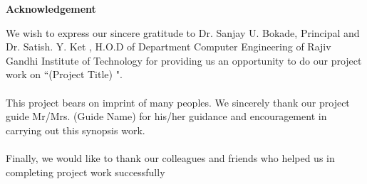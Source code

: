 \newpage
\thispagestyle{empty}
\vspace*{0.2cm}
\vspace{1cm}
\begin{center}
 \large\textbf{Acknowledgement}
\end{center}
\vspace{2cm}
\hspace{2cm}We wish to express our sincere gratitude to Dr. Sanjay U. Bokade, Principal and Dr. Satish. Y. Ket , H.O.D of Department Computer Engineering of Rajiv Gandhi Institute of Technology for providing us an opportunity to do our project work on “(Project Title) ".\\ 
\\
This project bears on imprint of many peoples. We sincerely thank our project guide Mr/Mrs. (Guide Name) for his/her guidance and encouragement in carrying out this synopsis work.\\  
\\
Finally, we would like to thank our colleagues and friends who helped us in completing project work successfully
\\
\\
\\
\\ 
\\
\\
\\
\\


\newpage

